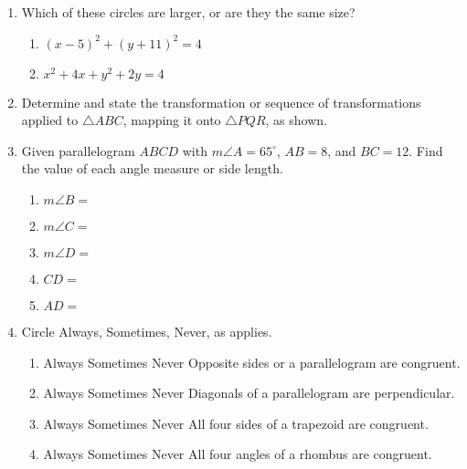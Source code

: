 \documentclass[12pt, twoside]{article}
\begin{document}
\begin{enumerate}
  \item Which of these circles are larger, or are they the same size?
    \begin{enumerate}
      \item $(x-5)^2+(y+11)^2=4$
      \item $x^2+4x+y^2+2y=4$
    \end{enumerate}

\newpage
  \item Determine and state the transformation or sequence of transformations  applied to $\triangle ABC$, mapping it onto $\triangle PQR$, as shown.
   \begin{center}
     \end{center}
\vspace{2cm}

   \item Given parallelogram $ABCD$ with $m\angle A=65^\circ$, $AB=8$, and $BC=12$. Find the value of each angle measure or side length.
     \begin{enumerate}
       \item $m\angle B=$\vspace{0.5cm}
       \item $m\angle C=$\vspace{0.5cm}
       \item $m\angle D=$\vspace{0.5cm}
       \item $CD=$ \vspace{0.5cm}
       \item $AD=$ \vspace{0.5cm}
     \end{enumerate}

  \item Circle Always, Sometimes, Never, as applies.
    \begin{enumerate}
      \item Always \quad Sometimes \quad  Never \quad Opposite sides or a parallelogram are congruent.
      \item Always \quad Sometimes \quad  Never \quad Diagonals of a parallelogram are perpendicular.
      \item Always \quad Sometimes \quad  Never \quad All four sides of a trapezoid are congruent.
      \item Always \quad Sometimes \quad  Never \quad All four angles of a rhombus are congruent.
    \end{enumerate}

\end{enumerate}
\end{document}
